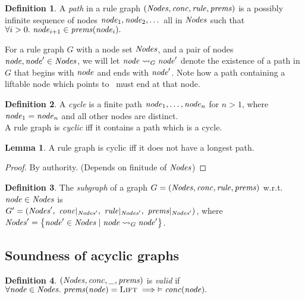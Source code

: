 \documentclass[10pt]{article}
\theoremstyle{definition}
\newtheorem{definition}{Definition}
\newtheorem{lemma}{Lemma}
\begin{document}
\begin{definition}
    A \emph{path} in a rule graph $(\mathit{Nodes},\mathit{conc},\mathit{rule},\mathit{prems})$
    is a possibly infinite sequence of nodes
    $\mathit{node}_1,\mathit{node}_2,\dots$
    all in $\mathit{Nodes}$
    such that
    $\forall i > 0.\
    \mathit{node}_{i+1} \in \mathit{prems}(\mathit{node}_i).
    $
\end{definition}

\newcommand*{\reaches}[3]{%
    \ensuremath{#1 \leadsto_{#3} #2}%
}
For a rule graph $G$ with a node set $\mathit{Nodes}$,
and a pair of nodes $\mathit{node}, \mathit{node}' \in \mathit{Nodes}$,
we will let \reaches{\node}{\node'}{G} denote
the existence of a path in $G$
that begins with $\mathit{node}$ and ends with $\mathit{node}'$.
Note how a path containing a liftable node 
which points to \LIFT\ must end at that node.

\begin{definition}
    A \emph{cycle} is a finite path $\mathit{node}_1,\dots,\mathit{node}_n$
    for $n>1$,
    where $\mathit{node}_1 = \mathit{node}_n$ and all other nodes are distinct.
    \\
    A rule graph is \emph{cyclic}
    iff it contains a path which is a cycle.
\end{definition}


\begin{lemma}
    A rule graph is cyclic iff
    it does not have a longest path.
\end{lemma}
\begin{proof}
By authority. (Depends on finitude of $\mathit{Nodes}$)
\end{proof}

\newcommand{\restrict}[2]{%
    #1 {\mid_{#2}} %
}

\begin{definition}
    The \emph{subgraph} of a graph $G=(\mathit{Nodes},\mathit{conc},\mathit{rule},\mathit{prems})$ w.r.t.\ $\mathit{node} \in \mathit{Nodes}$
    is 
    \\
    $G'=(
        \DomNode',\
        \restrict\MapConc{\DomNode'},\
        \restrict\MapRule{\DomNode'},\
        \restrict\MapPrems{\DomNode'}
    )$,
    where $\DomNode' = 
        \SetBuild(\node' \in \DomNode | \reaches{\node}{\node'}{G})$.
\end{definition}


\subsection{Soundness of acyclic graphs}

\begin{definition}
$(\mathit{Nodes},\mathit{conc},\_,\mathit{prems})$ is \emph{valid}
if
\(
    \forall \mathit{node} \in \mathit{Nodes}.\ \mathit{prems}(\mathit{node}) = \textsc{Lift} \implies
    \vDash \mathit{conc}(\mathit{node}).
\)
\end{definition}
\end{document}
